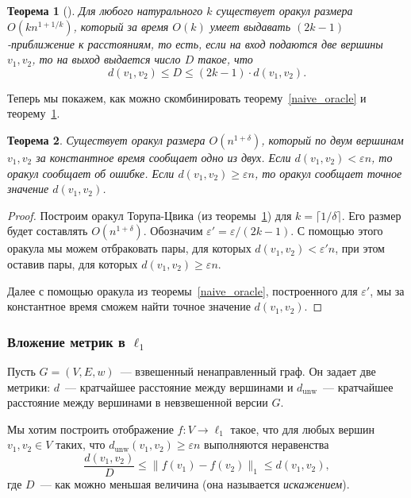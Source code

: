 \documentclass[12pt]{article}
\newcommand{\eps}{\varepsilon}
\newcommand{\dunw}{d_{\mathrm{unw}}}
\newtheorem{theorem}{Теорема}
\begin{document}
    \begin{theorem}[\cite{TZ05}]
        \label{thorup_zwick}
        Для любого натурального $k$ существует оракул размера $O(kn^{1 + 1/k})$, который за время $O(k)$
        умеет выдавать $(2k - 1)$-приближение к расстояниям, то есть, если на вход подаются две вершины $v_1, v_2$,
        то на выход выдается число $D$ такое, что
        $$
            d(v_1, v_2) \leq D \leq (2k - 1) \cdot d(v_1, v_2).
        $$
    \end{theorem}

    Теперь мы покажем, как можно скомбинировать теорему~\ref{naive_oracle} и теорему~\ref{thorup_zwick}.

    \begin{theorem}
        Существует оракул размера $O(n^{1 + \delta})$, который по двум вершинам $v_1, v_2$ за константное время
        сообщает одно из двух.
        Если $d(v_1, v_2) < \eps n$, то оракул сообщает об ошибке. Если $d(v_1, v_2) \geq \eps n$,
        то оракул сообщает точное значение $d(v_1, v_2)$.
    \end{theorem}
    \begin{proof}
        Построим оракул Торупа-Цвика (из теоремы~\ref{thorup_zwick}) для $k = \lceil 1 / \delta \rceil$.
        Его размер будет составлять $O(n^{1 + \delta})$. Обозначим $\eps' = \eps / (2k - 1)$.
        С помощью этого оракула мы можем отбраковать пары, для которых $d(v_1, v_2) < \eps' n$, при этом
        оставив пары, для которых $d(v_1, v_2) \geq \eps n$.

        Далее с помощью оракула из теоремы~\ref{naive_oracle}, построенного для $\eps'$, мы за константное время
        сможем найти точное значение $d(v_1, v_2)$.
    \end{proof}
    \subsubsection{Вложение метрик в $\ell_1$}
    \label{subsubsection_metric_embeddings}
    Пусть $G = (V, E, w)$~--- взвешенный ненаправленный граф. Он задает две метрики: $d$~--- кратчайшее расстояние
    между вершинами и $\dunw$~--- кратчайшее расстояние между вершинами в невзвешенной версии $G$.

    Мы хотим построить отображение $f \colon V \to \ell_1$ такое, что для любых вершин $v_1, v_2 \in V$ таких,
    что $\dunw(v_1, v_2) \geq \eps n$ выполняются неравенства
    $$
        \frac{d(v_1, v_2)}{D} \leq \|f(v_1) - f(v_2)\|_1 \leq d(v_1, v_2),
    $$
    где $D$~--- как можно меньшая величина (она называется \emph{искажением}).
\end{document}
